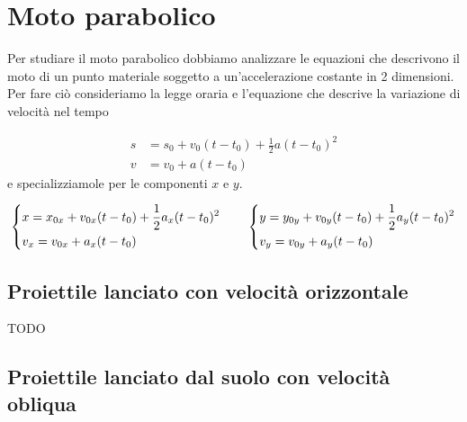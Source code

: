 \documentclass{article}
\begin{document}
\tableofcontents
\newpage

\section{Moto parabolico}
Per studiare il moto parabolico dobbiamo analizzare le equazioni che descrivono il moto di un punto materiale soggetto a un'accelerazione costante in 2 dimensioni.
Per fare ciò consideriamo la legge oraria e l'equazione che descrive la variazione di velocità nel tempo 

\begin{align}
  s &= s_0 + v_0 (t-t_0) + \frac{1}{2}a(t-t_0)^2 \\
  v &= v_0 + a(t-t_0)
\end{align}
e specializziamole per le componenti $x$ e $y$.

\begin{equation} \label{2dgeneric}
  \begin{dcases}
    x = x_{0x} + v_{0x} (t-t_0) + \frac{1}{2}a_x(t-t_0)^2 \\
    v_x = v_{0x} + a_x(t-t_0)
  \end{dcases}
  \qquad
  \begin{dcases}
    y = y_{0y} + v_{0y} (t-t_0) + \frac{1}{2}a_y(t-t_0)^2 \\
    v_y = v_{0y} + a_y(t-t_0)
  \end{dcases}
\end{equation}

\subsection{Proiettile lanciato con velocità orizzontale}
TODO

\subsection{Proiettile lanciato dal suolo con velocità obliqua}
\begin{center}
\end{center}
\end{document}
